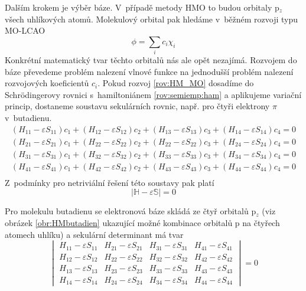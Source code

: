 Dalším krokem je výběr báze. V~případě metody HMO to budou orbitaly p$_z$ všech uhlíkových atomů. Molekulový orbital pak hledáme v~běžném rozvoji typu MO-LCAO
\begin{equation}
\phi= \sum_i c_i \chi_i
\label{rov:HM_MO}
\end{equation}
Konkrétní matematický tvar těchto orbitalů nás ale opět nezajímá. Rozvojem do báze převedeme problém nalezení vlnové funkce na jednodušší problém nalezení rozvojových koeficientů $c_i$. Pokud rozvoj \eqref{rov:HM_MO} dosadíme do Schr\"{o}dingerovy rovnici s~hamiltoniánem \eqref{rov:semiemp:ham} a aplikujeme variační princip, dostaneme soustavu sekulárních rovnic, např. pro čtyři elektrony $\pi$ v~butadienu.
\begin{equation}
\begin{split}
\left(H_{11}-\varepsilon S_{11}\right)c_1 + \left(H_{12}-\varepsilon S_{12}\right)c_2 + \left(H_{13}-\varepsilon S_{13}\right)c_3 + \left(H_{14}-\varepsilon S_{14}\right)c_4 = 0 \\ 
\left(H_{21}-\varepsilon S_{21}\right)c_1 + \left(H_{22}-\varepsilon S_{22}\right)c_2 + \left(H_{22}-\varepsilon S_{22}\right)c_3 + \left(H_{24}-\varepsilon S_{24}\right)c_4 = 0 \\ 
\left(H_{31}-\varepsilon S_{31}\right)c_1 + \left(H_{32}-\varepsilon S_{32}\right)c_2 + \left(H_{33}-\varepsilon S_{33}\right)c_3 + \left(H_{34}-\varepsilon S_{34}\right)c_4 = 0 \\ 
\left(H_{41}-\varepsilon S_{41}\right)c_1 + \left(H_{42}-\varepsilon S_{42}\right)c_2 + \left(H_{43}-\varepsilon S_{43}\right)c_3 + \left(H_{44}-\varepsilon S_{44}\right)c_4 = 0 \\  
\end{split}
\label{rov:sekularni}
\end{equation}
%
Z~podmínky pro netriviální řešení této soustavy pak platí
\begin{equation}
|\mathbb{H}-\varepsilon \mathbb{S}|=0 
\label{rov:HM_det}
\end{equation}

Pro molekulu butadienu se elektronová báze skládá ze čtyř orbitalů p$_z$ (viz obrázek \ref{obr:HMbutadien} ukazující možné kombinace orbitalů p na čtyřech atomech uhlíku) a sekulární determinant má tvar
\begin{equation}
\begin{vmatrix}
H_{11}-\varepsilon S_{11} & H_{21}-\varepsilon S_{21} & H_{31}-\varepsilon S_{31} & H_{41}-\varepsilon S_{41}  \\
H_{12}-\varepsilon S_{12} & H_{22}-\varepsilon S_{22} & H_{32}-\varepsilon S_{32} & H_{42}-\varepsilon S_{42}  \\
H_{13}-\varepsilon S_{13} & H_{23}-\varepsilon S_{23} & H_{33}-\varepsilon S_{33} & H_{43}-\varepsilon S_{43}  \\
H_{14}-\varepsilon S_{14} & H_{24}-\varepsilon S_{24} & H_{34}-\varepsilon S_{34} & H_{44}-\varepsilon S_{44}
\end{vmatrix}
= 0
\end{equation}



